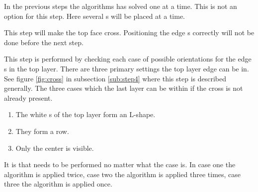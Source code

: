 In the previous steps the algorithms has solved one \cpiece{} at a time. 
This is not an option for this step. 
Here several \cpiece{}s will be placed at a time. 

This step will make the top face cross. 
Positioning the edge \cpiece{}s correctly will not be done before the next step. 

This step is performed by checking each case of possible orientations for the edge \cpiece{}s in the top layer. 
There are three primary settings the top layer edge \cpiece{} can be in. See figure \ref{fig:cross} in subsection \ref{sub:step4} where this step is described generally.
The three cases which the last layer can be within if the cross is not already present.
\begin{enumerate}
\item The white \facelet{}s of the top layer form an L-shape.
\item They form a row.
\item Only the center \facelet{} is visible. 
\end{enumerate}
It is  that needs to be performed no matter what the case is. In case one the algorithm is applied twice, case two the algorithm is applied three times, case three the algorithm is applied once.
